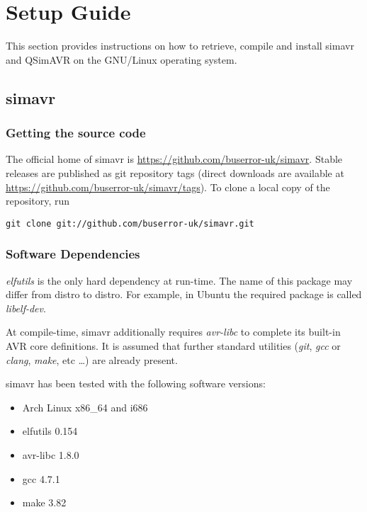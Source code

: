 
\chapter{Setup Guide}

This section provides instructions on how to retrieve, compile and install
simavr and QSimAVR on the GNU/Linux operating system.

\section{simavr}

\subsection{Getting the source code}

The official home of simavr is \url{https://github.com/buserror-uk/simavr}.
Stable releases are published as git repository tags (direct downloads are
available at \url{https://github.com/buserror-uk/simavr/tags}). To clone a local
copy of the repository, run

\begin{verbatim}
git clone git://github.com/buserror-uk/simavr.git
\end{verbatim}

\subsection{Software Dependencies}

\emph{elfutils} is the only hard dependency at run-time. The name of this
package may differ from distro to distro. For example, in Ubuntu the required
package is called \emph{libelf-dev}.

At compile-time, simavr additionally requires \emph{avr-libc} to complete its
built-in AVR core definitions. It is assumed that further standard
utilities (\emph{git}, \emph{gcc} or \emph{clang}, \emph{make}, etc \ldots) are
already present.

simavr has been tested with the following software versions:

\begin{itemize}
\item Arch Linux x86\_64 and i686
\item elfutils 0.154
\item avr-libc 1.8.0
\item gcc 4.7.1
\item make 3.82
\end{itemize}

